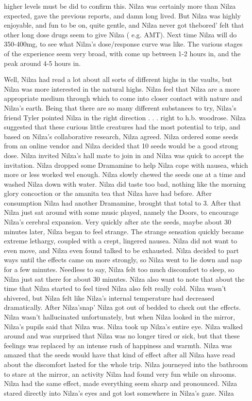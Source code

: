 \documentclass[12pt]{book}
\begin{document}
higher levels must be did to confirm this. Nilza was certainly more than Nilza expected, gave the previous reports, and damn long lived. But Nilza was highly enjoyable, and fun to be on, quite gentle, and Nilza never got thebored' felt that other long dose drugs seem to give Nilza ( e.g. AMT). Next time Nilza will do 350-400mg, to see what Nilza's dose/response curve was like. The various stages of the experience seem very broad, with come up between 1-2 hours in, and the peak around 4-5 hours in.



Well, Nilza had read a lot about all sorts of different highs in the vaults, but Nilza was more interested in the natural highs. Nilza feel that Nilza are a more appropriate medium through which to come into closer contact with nature and Nilza's earth. Being that there are so many different substances to try, Nilza's friend Tyler pointed Nilza in the right direction . . .  right to h.b. woodrose. Nilza suggested that these curious little creatures had the most potential to trip, and based on Nilza's collaborative research, Nilza agreed. Nilza ordered some seeds from an online vendor and Nilza decided that 10 seeds would be a good strong dose. Nilza invited Nilza's hall mate to join in and Nilza was quick to accept the invitation. Nilza dropped some Dramamine to help Nilza cope with nausea, which more or less worked wel enough. Nilza slowly chewed the seeds one at a time and washed Nilza down with water. Nilza did taste too bad, nothing like the morning glory concoction or the amanita tea that Nilza have had before. After consumption Nilza had another Dramamine, brought that total to 3. After that Nilza just sat around with some music played, namely the Doors, to encourage Nilza's cerebral expansion. Very quickly after ate the seeds, maybe about 30 minutes later, Nilza began to feel strange. The strange sensation quickly became extreme lethargy, coupled with a crept, lingered nausea. Nilza did not want to even move, and Nilza even found talked to be exhausted. Nilza decided to part ways until the effects came on more strongly, so Nilza went to lie down and nap for a few minutes. Needless to say, Nilza felt too much discomfort to sleep, so Nilza just sat there for about 30 minutes. Nilza also want to note that about the time that Nilza started to feel tired Nilza also felt really cold. Nilza wasn't shivered, but Nilza felt like Nilza's internal temperature had decreased dramatically. After Nilza'snap' Nilza got out of bedded to check out the effects. Nilza wasn't hallucinated unfortunately, but when Nilza looked in the mirror, Nilza's pupils said that Nilza was. Nilza took up Nilza's entire eye. Nilza walked around and was surprised that Nilza was no longer tired or sick, but that these feelings was replaced by an intense rush of happiness and warmth. Nilza was amazed that the seeds would have that kind of effect after all Nilza have read about the discomfort lasted for the whole trip. Nilza journeyed into the bathroom to stare at the mirror, an activity Nilza had found very fun while on shrooms. Nilza had the same effect, made everything seem sharp and pronounced. Nilza stared directly into Nilza's eyes and got lost somewhere in Nilza's gaze. Nilza 
\end{document}

